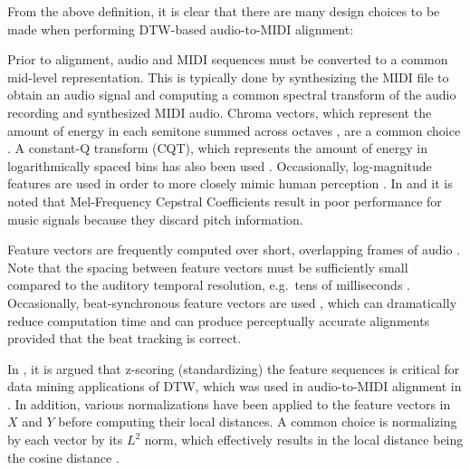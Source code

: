 \documentclass{article}
\begin{document}
From the above definition, it is clear that there are many design choices to be made when performing DTW-based audio-to-MIDI alignment:
\begin{description}[topsep=1pt,itemsep=-1pt,leftmargin=5pt]
\item[Feature representation ($X$ and $Y$):] Prior to alignment, audio and MIDI sequences must be converted to a common mid-level representation.
This is typically done by synthesizing the MIDI file to obtain an audio signal and computing a common spectral transform of the audio recording and synthesized MIDI audio.
Chroma vectors, which represent the amount of energy in each semitone summed across octaves \cite{fujishima1999realtime}, are a common choice \cite{hu2003polyphonic, ewert2012towards}.
A constant-Q transform (CQT), which represents the amount of energy in logarithmically spaced bins \cite{brown1991calculation} has also been used \cite{raffel2015large, dixon2005match, ellis2013aligning}.
Occasionally, log-magnitude features are used in order to more closely mimic human perception \cite{raffel2015large, ellis2013aligning, turetsky2003ground}.
In \cite{turetsky2003ground} and \cite{hu2003polyphonic} it is noted that Mel-Frequency Cepstral Coefficients result in poor performance for music signals because they discard pitch information.
\item[Time scale ($t_X$ and $t_Y$):] Feature vectors are frequently computed over short, overlapping frames of audio \cite{dixon2005match, turetsky2003ground, hu2003polyphonic}.
Note that the spacing between feature vectors must be sufficiently small compared to the auditory temporal resolution, e.g.\ tens of milliseconds \cite{blauert1997spatial}.
Occasionally, beat-synchronous feature vectors are used \cite{raffel2015large,ellis2013aligning}, which can dramatically reduce computation time and can produce perceptually accurate alignments provided that the beat tracking is correct.
\item[Normalization:] In \cite{rakthanmanon2012searching}, it is argued that z-scoring (standardizing) the feature sequences is critical for data mining applications of DTW, which was used in audio-to-MIDI alignment in \cite{hu2003polyphonic}.
In addition, various normalizations have been applied to the feature vectors in $X$ and $Y$ before computing their local distances.
A common choice is normalizing by each vector by its $L^2$ norm, which effectively results in the local distance being the cosine distance \cite{turetsky2003ground, ewert2012towards, raffel2015large, ellis2013aligning}.

\end{description}
\end{document}
